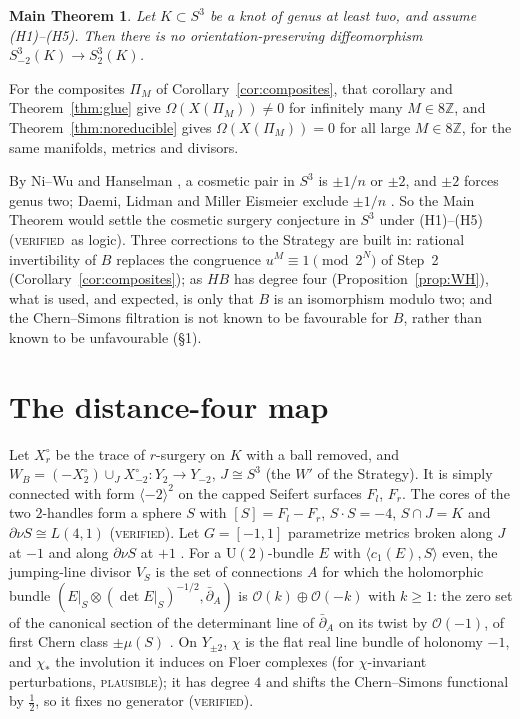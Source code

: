 \documentclass[10pt]{amsart}
\makeatletter
\numberwithin{equation}{section}
\theoremstyle{compact}
\newtheorem*{mainthm}{Main Theorem}
\renewenvironment{proof}[1][\proofname]{\par\pushQED{\qed}\normalfont
  \topsep4\p@\relax\trivlist\item[\hskip\labelsep\itshape#1\@addpunct{.}]%
  \ignorespaces}{\popQED\endtrivlist\@endpefalse}
\newcommand{\Z}{\mathbb Z}
\newcommand{\cO}{\mathcal O}
\newcommand{\ver}{\textsc{verified}}
\newcommand{\pla}{\textsc{plausible}}
\makeatother
\begin{document}
\begin{mainthm}
Let $K\subset S^3$ be a knot of genus at least two, and assume
\textup{(H1)--(H5)}. Then there is no orientation-preserving diffeomorphism
$S^3_{-2}(K)\to S^3_2(K)$.
\end{mainthm}

\begin{proof}
For the composites $\Pi_M$ of Corollary~\ref{cor:composites}, that corollary and
Theorem~\ref{thm:glue} give $\Omega(X(\Pi_M))\ne0$ for infinitely many
$M\in8\Z$, and Theorem~\ref{thm:noreducible} gives $\Omega(X(\Pi_M))=0$ for all
large $M\in8\Z$, for the same manifolds, metrics and divisors.
\end{proof}

By Ni--Wu \cite{NW} and Hanselman \cite[Thm.~2]{Ha}, a cosmetic pair in $S^3$ is
$\pm1/n$ or $\pm2$, and $\pm2$ forces genus two; Daemi, Lidman and Miller
Eismeier exclude $\pm1/n$ \cite[Thm.~1.3, Cor.~1.4]{DLME}. So the Main Theorem
would settle the cosmetic surgery conjecture in $S^3$ under (H1)--(H5)
(\ver\ as logic). Three corrections to the Strategy are built in: rational
invertibility of $B$ replaces the congruence $u^M\equiv1\pmod{2^N}$ of Step~2
(Corollary~\ref{cor:composites}); as $HB$ has degree four
(Proposition~\ref{prop:WH}), what is used, and expected, is only that $B$ is an
isomorphism modulo two; and the Chern--Simons filtration is not known to be
favourable for $B$, rather than known to be unfavourable (\S1).

\section{The distance-four map}

Let $X^\circ_r$ be the trace of $r$-surgery on $K$ with a ball removed, and
$W_B=(-X^\circ_2)\cup_JX^\circ_{-2}\colon Y_2\to Y_{-2}$, $J\cong S^3$ (the $W'$
of the Strategy). It is simply connected with form $\langle-2\rangle^2$ on the
capped Seifert surfaces $F_l$, $F_r$. The cores of the two $2$-handles form a
sphere $S$ with $[S]=F_l-F_r$, $S\cdot S=-4$, $S\cap J=K$ and $\partial\nu
S\cong L(4,1)$ (\ver). Let $G=[-1,1]$ parametrize metrics broken along $J$ at $-1$ and
along $\partial\nu S$ at $+1$ \cite[\S3.9]{KM11}. For a $\mathrm U(2)$-bundle $E$
with $\langle c_1(E),S\rangle$ even, the jumping-line divisor $V_S$ is the set
of connections $A$ for which the holomorphic bundle $(E|_S\otimes(\det
E|_S)^{-1/2},\bar\partial_A)$ is $\cO(k)\oplus\cO(-k)$ with $k\ge1$: the zero
set of the canonical section of the determinant line of $\bar\partial_A$ on its
twist by $\cO(-1)$, of first Chern class $\pm\mu(S)$ \cite{D90}. On $Y_{\pm2}$,
$\chi$ is the flat real line bundle of holonomy $-1$, and $\chi_*$ the
involution it induces on Floer complexes (for $\chi$-invariant perturbations,
\pla); it has degree $4$ and shifts the Chern--Simons functional by $\frac12$, so
it fixes no generator (\ver).
\end{document}
